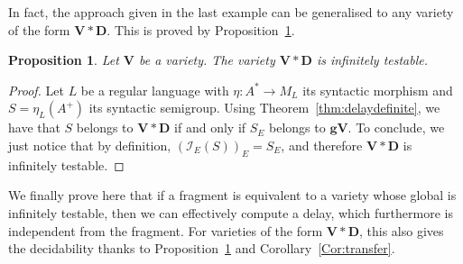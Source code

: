 \documentclass[submission,hidelink]{dmtcs-episciences}
\newtheorem{proposition}[theorem]{Proposition}
\newcommand{\D}{\mathbf{D}}
\newcommand{\V}{\mathbf{V}}
\newcommand{\gV}{\mathbf{gV}}
\newcommand{\tinf}[1]{\mathcal{I}_E(#1)}
\begin{document}
	In fact, the approach given in the last example can be generalised to any variety of the form $\V*\D$.
	This is proved by Proposition~\ref{Prop:VD}.



\begin{proposition}\label{Prop:VD}
	 Let $\V$ be a variety.
		The variety $\V*\D$ is infinitely testable.
\end{proposition}
	\begin{proof}
		Let $L$ be a regular language with $\eta:A^*\to M_L$ its syntactic morphism and $S=\eta_L(A^+)$
		its syntactic semigroup.
		Using Theorem~\ref{thm:delaydefinite}, we have that $S$ belongs to $\V*\D$ if and only if
		$S_E$ belongs to $\gV$. To conclude, we just notice that by definition, $(\tinf{S})_E = S_E$, and therefore
		$\V*\D$ is infinitely testable.
	\end{proof}











We finally prove here that if a fragment is equivalent to a variety whose global is infinitely testable, then we can effectively compute a delay, which furthermore is independent from the fragment.
For varieties of the form $\V*\D$, this also gives the decidability thanks to Proposition~\ref{Prop:VD} and
Corollary~\ref{Cor:transfer}.
\end{document}

